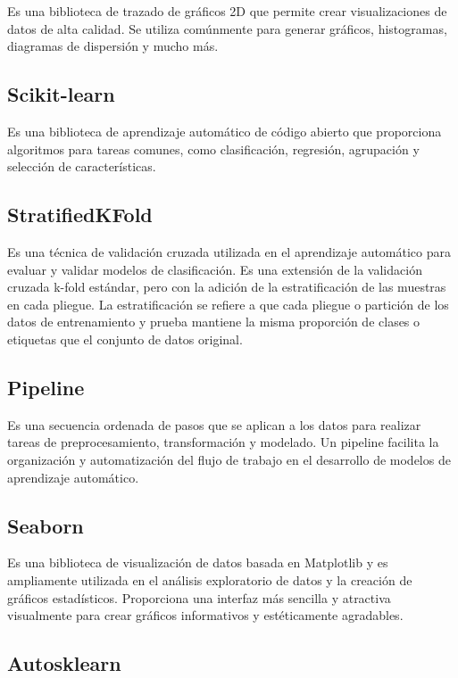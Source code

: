 Es una biblioteca de trazado de gráficos 2D que permite crear visualizaciones de datos de alta calidad. Se utiliza comúnmente para generar gráficos, histogramas, diagramas de dispersión y mucho más.

\subsection{Scikit-learn}

Es una biblioteca de aprendizaje automático de código abierto que proporciona algoritmos para tareas comunes, como clasificación, regresión, agrupación y selección de características.

\subsection{StratifiedKFold}

Es una técnica de validación cruzada utilizada en el aprendizaje automático para evaluar y validar modelos de clasificación. Es una extensión de la validación cruzada k-fold estándar, pero con la adición de la estratificación de las muestras en cada pliegue. La estratificación se refiere a que cada pliegue o partición de los datos de entrenamiento y prueba mantiene la misma proporción de clases o etiquetas que el conjunto de datos original.

\subsection{Pipeline}

Es una secuencia ordenada de pasos que se aplican a los datos para realizar tareas de preprocesamiento, transformación y modelado. Un pipeline facilita la organización y automatización del flujo de trabajo en el desarrollo de modelos de aprendizaje automático.

\subsection{Seaborn}

Es una biblioteca de visualización de datos basada en Matplotlib y es ampliamente utilizada en el análisis exploratorio de datos y la creación de gráficos estadísticos. Proporciona una interfaz más sencilla y atractiva visualmente para crear gráficos informativos y estéticamente agradables.

\subsection{Autosklearn} \label{autosklearn}

